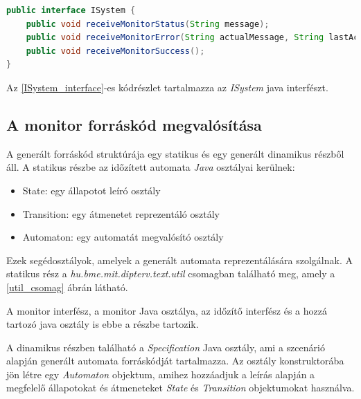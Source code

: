\begin{lstlisting}[language=java,frame=single, float=h!, caption={Rendszer interfész Java implementációja.},captionpos=b, label=ISystem_interface]
public interface ISystem {
	public void receiveMonitorStatus(String message);
	public void receiveMonitorError(String actualMessage, String lastAcceptedMessage);
	public void receiveMonitorSuccess();
}
\end{lstlisting}

Az \ref{ISystem_interface}-es kódrészlet tartalmazza az \textit{ISystem} java interfészt.

\subsection{A monitor forráskód megvalósítása}
A generált forráskód struktúrája egy statikus és egy generált dinamikus részből áll.
A statikus részbe az időzített automata \textit{Java} osztályai kerülnek:
\begin{itemize}
    \item State: egy állapotot leíró osztály
    \item Transition: egy átmenetet reprezentáló osztály
    \item Automaton: egy automatát megvalósító osztály
\end{itemize}
Ezek segédosztályok, amelyek a generált automata reprezentálására szolgálnak.
A statikus rész a \textit{hu.bme.mit.dipterv.text.util} csomagban található meg, amely a \ref{util_csomag} ábrán látható.

A monitor interfész, a monitor Java osztálya, az időzítő interfész és a hozzá tartozó java osztály is ebbe a részbe tartozik.

A dinamikus részben található a \textit{Specification} Java osztály, ami a szcenárió alapján generált automata forráskódját tartalmazza.
Az osztály konstruktorába jön létre egy \textit{Automaton} objektum, amihez hozzáadjuk a leírás alapján a megfelelő állapotokat és átmeneteket \textit{State} és \textit{Transition} objektumokat használva.

